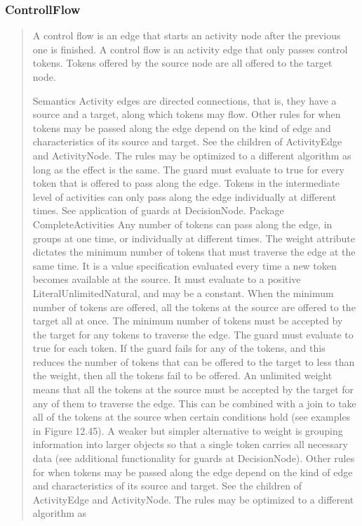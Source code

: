\subsubsection{ControllFlow}
\begin{quotation}
A control flow is an edge that starts an activity node after the previous one is finished. 
A control flow is an activity edge that only passes control tokens. Tokens
offered by the source node are all offered to the target node.

Semantics
Activity edges are directed connections, that is, they have a source and a target, along which tokens may flow.
Other rules for when tokens may be passed along the edge depend on the kind of edge and characteristics of its source
and target. See the children of ActivityEdge and ActivityNode. The rules may be optimized to a different algorithm as
long as the effect is the same.
The guard must evaluate to true for every token that is offered to pass along the edge. Tokens in the intermediate level of
activities can only pass along the edge individually at different times. See application of guards at DecisionNode.
Package CompleteActivities
Any number of tokens can pass along the edge, in groups at one time, or individually at different times. The weight
attribute dictates the minimum number of tokens that must traverse the edge at the same time. It is a value specification
evaluated every time a new token becomes available at the source. It must evaluate to a positive LiteralUnlimitedNatural,
and may be a constant. When the minimum number of tokens are offered, all the tokens at the source are offered to the
target all at once. The minimum number of tokens must be accepted by the target for any tokens to traverse the edge. The
guard must evaluate to true for each token. If the guard fails for any of the tokens, and this reduces the number of tokens
that can be offered to the target to less than the weight, then all the tokens fail to be offered. An unlimited weight means
that all the tokens at the source must be accepted by the target for any of them to traverse the edge. This can be combined
with a join to take all of the tokens at the source when certain conditions hold (see examples in Figure 12.45). A weaker
but simpler alternative to weight is grouping information into larger objects so that a single token carries all necessary
data (see additional functionality for guards at DecisionNode).
Other rules for when tokens may be passed along the edge depend on the kind of edge and characteristics of its source
and target. See the children of ActivityEdge and ActivityNode. The rules may be optimized to a different algorithm as

\end{quotation}
